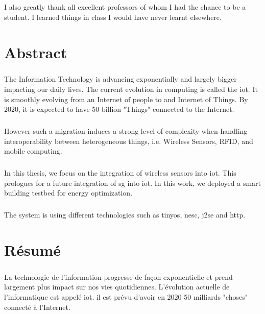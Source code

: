 \documentclass[oneside,12pt,a4paper,final]{book}
\begin{document}
\paragraph{}
I also greatly thank all excellent professors of whom I had the chance to be a student. I learned things in class  I would have never learnt elsewhere.


\chapter{Abstract}
\paragraph{}
The Information Technology is advancing exponentially and largely bigger impacting our daily lives. The current evolution in computing is called the \gls{iot}. It is smoothly evolving from an Internet of people to and Internet of Things. By 2020, it is expected to have 50 billion "Things" connected to the Internet. 
\paragraph{}
However such a migration induces a strong level of complexity when handling interoperability between heterogeneous things, i.e. Wireless Sensors, RFID, and mobile computing.
\paragraph{}
In this thesis, we focus on the  integration of wireless sensors into \gls{iot}. This prologues for a future integration of \gls{sg} into \gls{iot}. In this work, we deployed a smart building testbed for energy optimization.
\paragraph{}
The system is using different technologies such as \gls{tinyos}, \gls{nesc}, \gls{j2se} and  \gls{http}.

\chapter{Résumé}
\paragraph{}
La technologie de l'information progresse de façon exponentielle et prend largement plus impact sur nos vies quotidiennes. L'évolution actuelle de l'informatique est appelé \gls{iot}. il est prévu d'avoir en 2020 50 milliards "choses" connecté à l'Internet.
\end{document}
